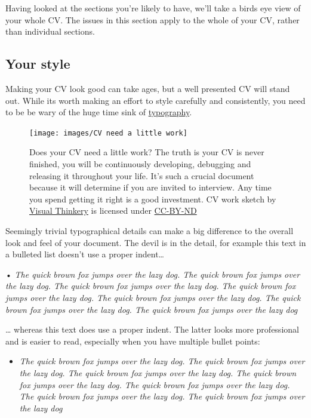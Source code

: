 \documentclass[
]{book}
\providecommand{\tightlist}{%
  \setlength{\itemsep}{0pt}\setlength{\parskip}{0pt}}
\begin{document}
Having looked at the sections you're likely to have, we'll take a birds eye view of your whole CV. The issues in this section apply to the whole of your CV, rather than individual sections.

\hypertarget{pdf}{%
\subsection{Your style}\label{pdf}}

Making your CV look good can take ages, but a well presented CV will stand out. While its worth making an effort to style carefully and consistently, you need to be be wary of the huge time sink of \href{https://en.wikipedia.org/wiki/Typography}{typography}.

\begin{figure}

{\centering \texttt{[image: images/CV need a little work]} 

}

\caption{Does your CV need a little work? The truth is your CV is never finished, you will be continuously developing, debugging and releasing it throughout your life. It's such a crucial document because it will determine if you are invited to interview. Any time you spend getting it right is a good investment. CV work sketch by \href{https://visualthinkery.com}{Visual Thinkery} is licensed under \href{https://creativecommons.org/licenses/by-nd/4.0/}{CC-BY-ND}}\label{fig:cvwork-fig}
\end{figure}



Seemingly trivial typographical details can make a big difference to the overall look and feel of your document. The devil is in the detail, for example this text in a bulleted list doesn't use a proper indent\ldots{}

• \emph{The quick brown fox jumps over the lazy dog. The quick brown fox jumps over the lazy dog. The quick brown fox jumps over the lazy dog. The quick brown fox jumps over the lazy dog. The quick brown fox jumps over the lazy dog. The quick brown fox jumps over the lazy dog. The quick brown fox jumps over the lazy dog}

\ldots{} whereas this text does use a proper indent. The latter looks more professional and is easier to read, especially when you have multiple bullet points:

\begin{itemize}
\tightlist
\item
  \emph{The quick brown fox jumps over the lazy dog. The quick brown fox jumps over the lazy dog. The quick brown fox jumps over the lazy dog. The quick brown fox jumps over the lazy dog. The quick brown fox jumps over the lazy dog. The quick brown fox jumps over the lazy dog. The quick brown fox jumps over the lazy dog}
\end{itemize}
\end{document}
